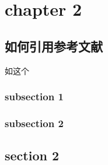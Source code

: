 \chapter{chapter 2}
\section{如何引用参考文献}
如这个\cite{song_score-based_2020}
\subsection{subsection 1}
\subsection{subsection 2}
\section{section 2}